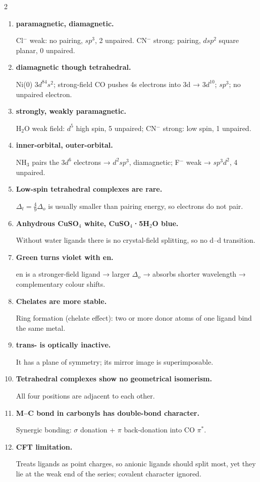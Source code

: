 \documentclass[10pt,a4paper]{extarticle}
\newenvironment{rqlist}{\begin{enumerate}[leftmargin=12pt,label={\sffamily\bfseries\scriptsize\color{uc}\arabic*.},itemsep=1pt]}{\end{enumerate}}
\newcommand{\ans}{\par\hspace*{2pt}{\color{uc}$\hookrightarrow$}\;}
\begin{document}
\begin{multicols}{2}
\begin{rqlist}
\item \textbf{ paramagnetic,  diamagnetic.}\ans Cl$^-$ weak: no pairing, $sp^3$, 2 unpaired. CN$^-$ strong: pairing, $dsp^2$ square planar, 0 unpaired.
\item \textbf{\ce{[Ni(CO)4]} diamagnetic though tetrahedral.}\ans Ni(0) $3d^84s^2$; strong-field CO pushes 4s electrons into 3d → $3d^{10}$; $sp^3$; no unpaired electron.
\item \textbf{ strongly,  weakly paramagnetic.}\ans H$_2$O weak field: $d^5$ high spin, 5 unpaired; CN$^-$ strong: low spin, 1 unpaired.
\item \textbf{ inner-orbital,  outer-orbital.}\ans NH$_3$ pairs the $3d^6$ electrons → $d^2sp^3$, diamagnetic; F$^-$ weak → $sp^3d^2$, 4 unpaired.
\item \textbf{Low-spin tetrahedral complexes are rare.}\ans $\Delta_t=\frac49\Delta_o$ is usually smaller than pairing energy, so electrons do not pair.
\item \textbf{Anhydrous CuSO$_4$ white, CuSO$_4$·5H$_2$O blue.}\ans Without water ligands there is no crystal-field splitting, so no d--d transition.
\item \textbf{Green  turns violet with en.}\ans en is a stronger-field ligand → larger $\Delta_o$ → absorbs shorter wavelength → complementary colour shifts.
\item \textbf{Chelates are more stable.}\ans Ring formation (chelate effect): two or more donor atoms of one ligand bind the same metal.
\item \textbf{trans-\ce{[CoCl2(en)2]+} is optically inactive.}\ans It has a plane of symmetry; its mirror image is superimposable.
\item \textbf{Tetrahedral complexes show no geometrical isomerism.}\ans All four positions are adjacent to each other.
\item \textbf{M--C bond in carbonyls has double-bond character.}\ans Synergic bonding: $\sigma$ donation + $\pi$ back-donation into CO $\pi^*$.
\item \textbf{CFT limitation.}\ans Treats ligands as point charges, so anionic ligands should split most, yet they lie at the weak end of the series; covalent character ignored.
\end{rqlist}


\end{multicols}
\end{document}
